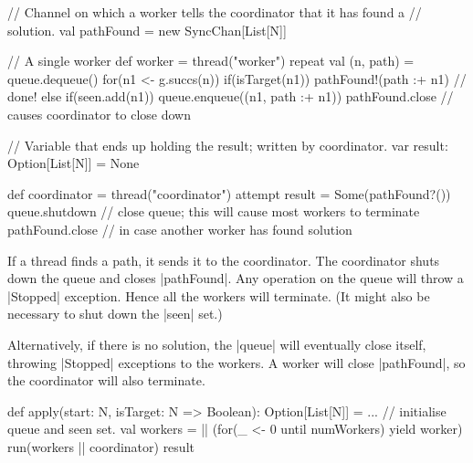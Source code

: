 
\begin{slide}

\begin{scala}
    // Channel on which a worker tells the coordinator that it has found a
    // solution.
    val pathFound = new SyncChan[List[N]]

    // A single worker
    def worker = thread("worker"){
      repeat{
        val (n, path) = queue.dequeue()
        for(n1 <- g.succs(n)){
          if(isTarget(n1)) pathFound!(path :+ n1) // done!
          else if(seen.add(n1)) queue.enqueue((n1, path :+ n1))
        }
      }
      pathFound.close // causes coordinator to close down
    }
\end{scala}
\end{slide}



\begin{slide}

\begin{scala}
    // Variable that ends up holding the result; written by coordinator. 
    var result: Option[List[N]] = None

    def coordinator = thread("coordinator"){
      attempt{ result = Some(pathFound?()) }{ }
      queue.shutdown // close queue; this will cause most workers to terminate
      pathFound.close // in case another worker has found solution
    }
\end{scala}

If a thread finds a path, it sends it to the coordinator.  The coordinator
shuts down the queue and closes |pathFound|.  Any operation on the queue will
throw a |Stopped| exception.  Hence all the workers will terminate.  (It might
also be necessary to shut down the |seen| set.)

Alternatively, if there is no solution, the |queue| will eventually close
itself, throwing |Stopped| exceptions to the workers.  A worker will close
|pathFound|, so the coordinator will also terminate. 
\end{slide}


\begin{slide}

\begin{scala}
  def apply(start: N, isTarget: N => Boolean): Option[List[N]] = {
    ... // initialise queue and seen set.
    val workers = || (for(_ <- 0 until numWorkers) yield worker)
    run(workers || coordinator)
    result
  }
\end{scala}
\end{slide}

